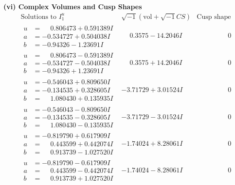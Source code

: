 \documentclass[1p]{elsarticle_modified}
\theoremstyle{definition}
\newcommand{\I}{\sqrt{-1}}
\begin{document}
\newpage\flushleft \textbf{(vi) Complex Volumes and Cusp Shapes}
$$\begin{array}{c|c|c}  
\text{Solutions to }I^u_{1}& \I (\text{vol} + \sqrt{-1}CS) & \text{Cusp shape}\\
 \hline 
\begin{aligned}
u &= \phantom{-}0.806473 + 0.591389 I \\
a &= -0.534727 + 0.504038 I \\
b &= -0.94326 - 1.23691 I\end{aligned}
 & \phantom{-}0.3575 - 14.2046 I & \phantom{-0.000000 } 0 \\ \hline\begin{aligned}
u &= \phantom{-}0.806473 - 0.591389 I \\
a &= -0.534727 - 0.504038 I \\
b &= -0.94326 + 1.23691 I\end{aligned}
 & \phantom{-}0.3575 + 14.2046 I & \phantom{-0.000000 } 0 \\ \hline\begin{aligned}
u &= -0.546043 + 0.809650 I \\
a &= -0.134535 + 0.328605 I \\
b &= \phantom{-}1.080430 + 0.135935 I\end{aligned}
 & -3.71729 + 3.01524 I & \phantom{-0.000000 } 0 \\ \hline\begin{aligned}
u &= -0.546043 - 0.809650 I \\
a &= -0.134535 - 0.328605 I \\
b &= \phantom{-}1.080430 - 0.135935 I\end{aligned}
 & -3.71729 - 3.01524 I & \phantom{-0.000000 } 0 \\ \hline\begin{aligned}
u &= -0.819790 + 0.617909 I \\
a &= \phantom{-}0.443599 + 0.442074 I \\
b &= \phantom{-}0.913739 - 1.027520 I\end{aligned}
 & -1.74024 + 8.28061 I & \phantom{-0.000000 } 0 \\ \hline\begin{aligned}
u &= -0.819790 - 0.617909 I \\
a &= \phantom{-}0.443599 - 0.442074 I \\
b &= \phantom{-}0.913739 + 1.027520 I\end{aligned}
 & -1.74024 - 8.28061 I & \phantom{-0.000000 } 0 \\ \hline\begin{aligned}

\end{aligned}
\end{array}$$
\end{document}
